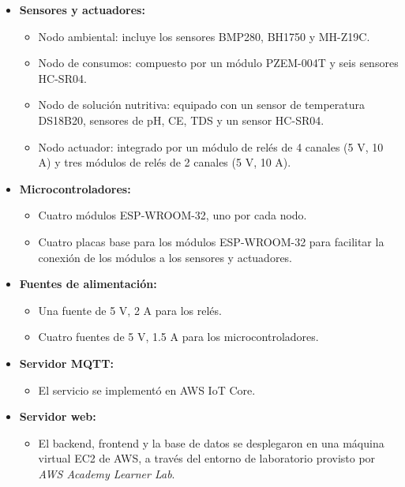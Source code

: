 \begin{itemize}
    \item \textbf{Sensores y actuadores:}
          \begin{itemize}
              \item Nodo ambiental: incluye los sensores BMP280, BH1750 y MH-Z19C.
              \item Nodo de consumos: compuesto por un módulo PZEM-004T y seis sensores HC-SR04.
              \item Nodo de solución nutritiva: equipado con un sensor de temperatura DS18B20,
                    sensores de pH, CE, TDS y un sensor HC-SR04.
              \item Nodo actuador: integrado por un módulo de relés de 4 canales (5 V, 10 A) y tres
                    módulos de relés de 2 canales (5 V, 10 A).
          \end{itemize}

    \item \textbf{Microcontroladores:}
          \begin{itemize}
              \item Cuatro módulos ESP-WROOM-32, uno por cada nodo.
              \item Cuatro placas base \cite{PlacaBaseESP32} para los módulos ESP-WROOM-32 para
                    facilitar la conexión de los módulos a los sensores y actuadores.
          \end{itemize}

    \item \textbf{Fuentes de alimentación:}
          \begin{itemize}
              \item Una fuente de 5 V, 2 A para los relés.
              \item Cuatro fuentes de 5 V, 1.5 A para los microcontroladores.
          \end{itemize}

    \item \textbf{Servidor MQTT:}
          \begin{itemize}
              \item El servicio se implementó en AWS IoT Core.
          \end{itemize}

    \item \textbf{Servidor web:}
          \begin{itemize}
              \item El backend, frontend y la base de datos se desplegaron en una máquina virtual
                    EC2 de AWS, a través del entorno de laboratorio provisto por \textit{AWS
                        Academy Learner Lab}.
          \end{itemize}
\end{itemize}

